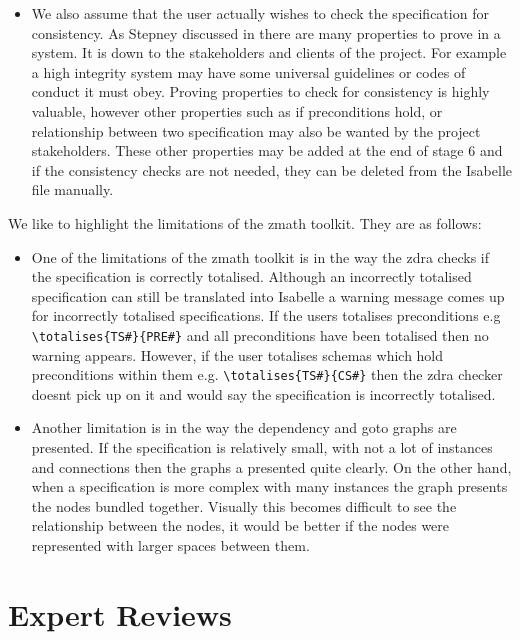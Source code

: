 \begin{itemize}
\item We also assume that the user actually wishes to check the specification
for consistency. As Stepney discussed in \cite{stepney1998tale} there are many
properties to prove in a system. It is down to the stakeholders and clients of
the project. For example a high integrity system may have some universal
guidelines or codes of conduct it must obey. Proving properties to check for
consistency is highly valuable, however other properties such as if
preconditions hold, or relationship between two specification may also be wanted
by the project stakeholders. These other properties may be added at the end of
stage 6 and if the consistency checks are not needed, they can be deleted from
the Isabelle file manually.

\end{itemize}

We like to highlight the limitations of the \gls{zmath} toolkit. They are as
follows:

\begin{itemize}
\item One of the limitations of the \gls{zmath} toolkit is in the way the
\gls{zdra} checks if the specification is correctly totalised. Although an
incorrectly totalised specification can still be translated into Isabelle a
warning message comes up for incorrectly totalised specifications. If the users
totalises preconditions e.g \verb|\totalises{TS#}{PRE#}| and all preconditions
have been totalised then no warning appears. However, if the user totalises
schemas which hold preconditions within them e.g. \verb|\totalises{TS#}{CS#}|
then the \gls{zdra} checker doesnt pick up on it and would say the specification
is incorrectly totalised.

\item Another limitation is in the way the dependency and goto graphs are
presented. If the specification is relatively small, with not a lot of instances
and connections then the graphs a presented quite clearly. On the other hand,
when a specification is more complex with many instances the graph presents the
nodes bundled together. Visually this becomes difficult to see the relationship
between the nodes, it would be better if the nodes were represented with larger
spaces between them.
\end{itemize}

\section{Expert Reviews}

